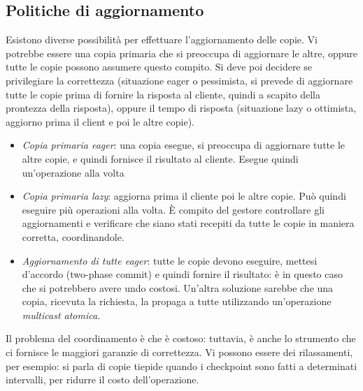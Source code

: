 \subsection{Politiche di aggiornamento}
Esistono diverse possibilità per effettuare l'aggiornamento delle copie. Vi potrebbe essere una copia primaria che si
preoccupa di aggiornare le altre, oppure tutte le copie possono assumere questo compito. Si deve poi decidere se
privilegiare la correttezza (situazione eager o pessimista, si prevede di aggiornare tutte le copie prima di fornire
la risposta al cliente, quindi a scapito della prontezza della risposta), oppure il tempo di risposta (situazione 
lazy o ottimista, aggiorno prima il client e poi le altre copie).
\begin{itemize}
 \item \textit{Copia primaria eager}: una copia esegue, si preoccupa di aggiornare tutte le altre copie, e quindi
 fornisce il risultato al cliente. Esegue quindi un'operazione alla volta
 \item \textit{Copia primaria lazy}: aggiorna prima il cliente poi le altre copie. Può quindi eseguire più operazioni
 alla volta. È compito del gestore controllare gli aggiornamenti e verificare che siano stati recepiti da tutte le copie
 in maniera corretta, coordinandole.
 \item \textit{Aggiornamento di tutte eager}: tutte le copie devono eseguire, mettesi d'accordo (two-phase commit) e
 quindi fornire il risultato: è in questo caso che si potrebbero avere undo costosi. Un'altra soluzione sarebbe che
 una copia, ricevuta la richiesta, la propaga a tutte utilizzando un'operazione \textit{multicast atomica}.
\end{itemize}
Il problema del coordinamento è che è costoso: tuttavia, è anche lo strumento che ci fornisce le maggiori garanzie di
correttezza. Vi possono essere dei rilassamenti, per esempio: si parla di copie tiepide quando i checkpoint sono fatti
a determinati intervalli, per ridurre il costo dell'operazione.
